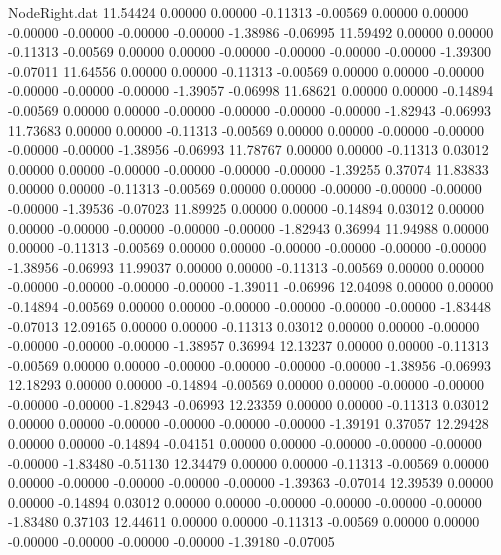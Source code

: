\begin{filecontents}{NodeRight.dat}
  11.54424    0.00000    0.00000    -0.11313   -0.00569    0.00000    0.00000   -0.00000   -0.00000   -0.00000   -0.00000   -1.38986   -0.06995
  11.59492    0.00000    0.00000    -0.11313   -0.00569    0.00000    0.00000   -0.00000   -0.00000   -0.00000   -0.00000   -1.39300   -0.07011
  11.64556    0.00000    0.00000    -0.11313   -0.00569    0.00000    0.00000   -0.00000   -0.00000   -0.00000   -0.00000   -1.39057   -0.06998
  11.68621    0.00000    0.00000    -0.14894   -0.00569    0.00000    0.00000   -0.00000   -0.00000   -0.00000   -0.00000   -1.82943   -0.06993
  11.73683    0.00000    0.00000    -0.11313   -0.00569    0.00000    0.00000   -0.00000   -0.00000   -0.00000   -0.00000   -1.38956   -0.06993
  11.78767    0.00000    0.00000    -0.11313    0.03012    0.00000    0.00000   -0.00000   -0.00000   -0.00000   -0.00000   -1.39255    0.37074
  11.83833    0.00000    0.00000    -0.11313   -0.00569    0.00000    0.00000   -0.00000   -0.00000   -0.00000   -0.00000   -1.39536   -0.07023
  11.89925    0.00000    0.00000    -0.14894    0.03012    0.00000    0.00000   -0.00000   -0.00000   -0.00000   -0.00000   -1.82943    0.36994
  11.94988    0.00000    0.00000    -0.11313   -0.00569    0.00000    0.00000   -0.00000   -0.00000   -0.00000   -0.00000   -1.38956   -0.06993
  11.99037    0.00000    0.00000    -0.11313   -0.00569    0.00000    0.00000   -0.00000   -0.00000   -0.00000   -0.00000   -1.39011   -0.06996
  12.04098    0.00000    0.00000    -0.14894   -0.00569    0.00000    0.00000   -0.00000   -0.00000   -0.00000   -0.00000   -1.83448   -0.07013
  12.09165    0.00000    0.00000    -0.11313    0.03012    0.00000    0.00000   -0.00000   -0.00000   -0.00000   -0.00000   -1.38957    0.36994
  12.13237    0.00000    0.00000    -0.11313   -0.00569    0.00000    0.00000   -0.00000   -0.00000   -0.00000   -0.00000   -1.38956   -0.06993
  12.18293    0.00000    0.00000    -0.14894   -0.00569    0.00000    0.00000   -0.00000   -0.00000   -0.00000   -0.00000   -1.82943   -0.06993
  12.23359    0.00000    0.00000    -0.11313    0.03012    0.00000    0.00000   -0.00000   -0.00000   -0.00000   -0.00000   -1.39191    0.37057
  12.29428    0.00000    0.00000    -0.14894   -0.04151    0.00000    0.00000   -0.00000   -0.00000   -0.00000   -0.00000   -1.83480   -0.51130
  12.34479    0.00000    0.00000    -0.11313   -0.00569    0.00000    0.00000   -0.00000   -0.00000   -0.00000   -0.00000   -1.39363   -0.07014
  12.39539    0.00000    0.00000    -0.14894    0.03012    0.00000    0.00000   -0.00000   -0.00000   -0.00000   -0.00000   -1.83480    0.37103
  12.44611    0.00000    0.00000    -0.11313   -0.00569    0.00000    0.00000   -0.00000   -0.00000   -0.00000   -0.00000   -1.39180   -0.07005

\end{filecontents}

